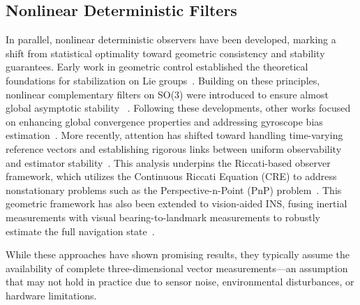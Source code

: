 \subsection{Nonlinear Deterministic Filters} 
In parallel, nonlinear deterministic observers have been developed, marking a shift from statistical optimality toward geometric consistency and stability guarantees. Early work in geometric control established the theoretical foundations for stabilization on Lie groups~\cite{Jurdjevic_1972,Bullo_1999,Morin_2003}. Building on these principles, nonlinear complementary filters on SO(3) were introduced to ensure almost global asymptotic stability ~\cite{Mahony_Hamel_Pflimlin,Baldwin_2007}. 
Following these developments, other works focused on enhancing global convergence properties and addressing gyroscope bias estimation~\cite{tayebi2006attitude,Sanyal_2008,Lageman_2009,Vasconcelos_2010,hua2014implementation,batista2012sensor,zlotnik2016nonlinear}. More recently, attention has shifted toward handling time-varying reference vectors and establishing rigorous links between uniform observability and estimator stability~\cite{grip2011attitude,Trumpf_2012}. This analysis underpins the Riccati-based observer framework, which utilizes the Continuous Riccati Equation (CRE) to address nonstationary problems such as the Perspective-n-Point (PnP) problem~\cite{hamel2018riccati}. This geometric framework has also been extended to vision-aided INS, fusing inertial measurements with visual bearing-to-landmark measurements to robustly estimate the full navigation state~\cite{Wang_2022}.

While these approaches have shown promising results, they typically assume the availability of complete three-dimensional vector measurements—an assumption that may not hold in practice due to sensor noise, environmental disturbances, or hardware limitations.

